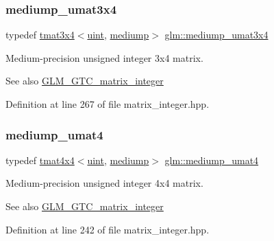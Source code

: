 \subsubsection{\texorpdfstring{mediump\_umat3x4}{mediump\_umat3x4}}
{\footnotesize\ttfamily typedef \mbox{\hyperlink{structglm_1_1tmat3x4}{tmat3x4}}$<$\mbox{\hyperlink{group__core__precision_ga4fd29415871152bfb5abd588334147c8}{uint}}, \mbox{\hyperlink{namespaceglm_a0f04f086094c747d227af4425893f545a6416f3ea0c9025fb21ed50c4d6620482}{mediump}}$>$ \mbox{\hyperlink{group__gtc__matrix__integer_ga21a2361cc10822ad1a2297ac286c8e26}{glm\+::mediump\+\_\+umat3x4}}}

Medium-\/precision unsigned integer 3x4 matrix. \begin{DoxySeeAlso}{See also}
\mbox{\hyperlink{group__gtc__matrix__integer}{G\+L\+M\+\_\+\+G\+T\+C\+\_\+matrix\+\_\+integer}} 
\end{DoxySeeAlso}


Definition at line 267 of file matrix\+\_\+integer.\+hpp.

\mbox{\label{group__gtc__matrix__integer_ga3eb3a5d85ec876ba65fad5525a5dda56}} 
\subsubsection{\texorpdfstring{mediump\_umat4}{mediump\_umat4}}
{\footnotesize\ttfamily typedef \mbox{\hyperlink{structglm_1_1tmat4x4}{tmat4x4}}$<$\mbox{\hyperlink{group__core__precision_ga4fd29415871152bfb5abd588334147c8}{uint}}, \mbox{\hyperlink{namespaceglm_a0f04f086094c747d227af4425893f545a6416f3ea0c9025fb21ed50c4d6620482}{mediump}}$>$ \mbox{\hyperlink{group__gtc__matrix__integer_ga3eb3a5d85ec876ba65fad5525a5dda56}{glm\+::mediump\+\_\+umat4}}}

Medium-\/precision unsigned integer 4x4 matrix. \begin{DoxySeeAlso}{See also}
\mbox{\hyperlink{group__gtc__matrix__integer}{G\+L\+M\+\_\+\+G\+T\+C\+\_\+matrix\+\_\+integer}} 
\end{DoxySeeAlso}


Definition at line 242 of file matrix\+\_\+integer.\+hpp.

\mbox{\label{group__gtc__matrix__integer_ga9dd5ce011ca43d90cf1b94084c7e90ac}} 
